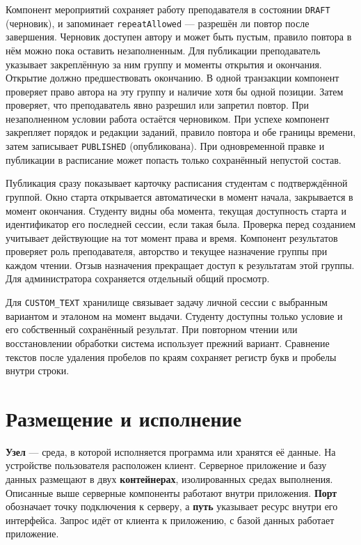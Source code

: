 \documentclass[12pt,a4paper]{article}
\begin{document}
\hypertarget{подготовка-мероприятия-и-расписание-группы}{}

Компонент мероприятий сохраняет работу преподавателя в состоянии \texttt{DRAFT} (черновик), и запоминает \texttt{repeatAllowed} --- разрешён ли повтор после завершения. Черновик доступен автору и может быть пустым, правило повтора в нём можно пока оставить незаполненным. Для публикации преподаватель указывает закреплённую за ним группу и моменты открытия и окончания. Открытие должно предшествовать окончанию. В одной транзакции компонент проверяет право автора на эту группу и наличие хотя бы одной позиции. Затем проверяет, что преподаватель явно разрешил или запретил повтор. При незаполненном условии работа остаётся черновиком. При успехе компонент закрепляет порядок и редакции заданий, правило повтора и обе границы времени, затем записывает \texttt{PUBLISHED} (опубликована). При одновременной правке и публикации в расписание может попасть только сохранённый непустой состав.

Публикация сразу показывает карточку расписания студентам с подтверждённой группой. Окно старта открывается автоматически в момент начала, закрывается в момент окончания. Студенту видны оба момента, текущая доступность старта и идентификатор его последней сессии, если такая была. Проверка перед созданием учитывает действующие на тот момент права и время. Компонент результатов проверяет роль преподавателя, авторство и текущее назначение группы при каждом чтении. Отзыв назначения прекращает доступ к результатам этой группы. Для администратора сохраняется отдельный общий просмотр.

Для \texttt{CUSTOM\_\allowbreak{}TEXT} хранилище связывает задачу личной сессии с выбранным вариантом и эталоном на момент выдачи. Студенту доступны только условие и его собственный сохранённый результат. При повторном чтении или восстановлении обработки система использует прежний вариант. Сравнение текстов после удаления пробелов по краям сохраняет регистр букв и пробелы внутри строки.

\section{Размещение и исполнение}\label{3-ux440ux430ux437ux43cux435ux449ux435ux43dux438ux435-ux438-ux438ux441ux43fux43eux43bux43dux435ux43dux438ux435}

\hypertarget{3-размещение-и-исполнение}{}

\textbf{Узел} --- среда, в которой исполняется программа или хранятся её данные. На устройстве пользователя расположен клиент. Серверное приложение и базу данных размещают в двух \textbf{контейнерах}, изолированных средах выполнения. Описанные выше серверные компоненты работают внутри приложения. \textbf{Порт} обозначает точку подключения к серверу, а \textbf{путь} указывает ресурс внутри его интерфейса. Запрос идёт от клиента к приложению, с базой данных работает приложение.
\end{document}

